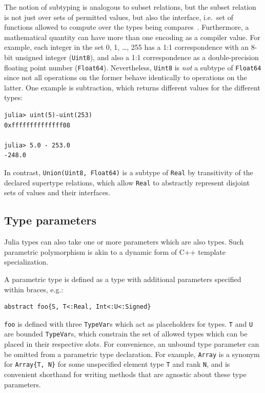 \documentclass[pldi]{sigplanconf-pldi15}
\begin{document}
The notion of subtyping is analogous to subset relations, but the subset
relation is not just over sets of permitted values, but also the interface,
i.e.\ set of functions allowed to compute over the types being
compares~\cite{Scott1976,Liskov1974,Liskov1992}. Furthermore, a mathematical
quantity can have more than one encoding as a compiler value. For example, each
integer in the set {0, 1, \dots, 255} has a 1:1 correspondence with an 8-bit
unsigned integer (\verb|Uint8|), and also a 1:1 correspondence as a
double-precision floating point number (\verb|Float64|). Nevertheless,
\verb|Uint8| is \textit{not} a subtype of \verb|Float64| since not all
operations on the former behave identically to operations on the latter. One
example is subtraction, which returns different values for the different types:

\begin{lstlisting}
julia> uint(5)-uint(253)
0xffffffffffffff08

julia> 5.0 - 253.0
-248.0
\end{lstlisting}
%
In contrast, \verb|Union(Uint8, Float64)| is a subtype of \verb|Real| by
transitivity of the declared supertype relations, which allow \verb|Real|
to abstractly represent disjoint sets of values and their interfaces.


\subsection{Type parameters}

Julia types can also take one or more parameters which are also types. Such
parametric polymorphism is akin to a dynamic form of C++ template
specialization.

A parametric type is defined as a type with additional parameters specified
within braces, e.g.:

\begin{lstlisting}
abstract foo{S, T<:Real, Int<:U<:Signed}
\end{lstlisting}
%
\verb|foo| is defined with three \verb|TypeVar|s which act as placeholders for
types. \verb|T| and \verb|U| are bounded \verb|TypeVar|s, which constrain the
set of allowed types which can be placed in their respective slots. For
convenience, an unbound type parameter can be omitted from a parametric type
declaration. For example, \verb|Array| is a synonym for \verb|Array{T, N}|
for some unspecified element type \verb|T| and rank \verb|N|, and is convenient
shorthand for writing methods that are agnostic about these type parameters.
\end{document}
